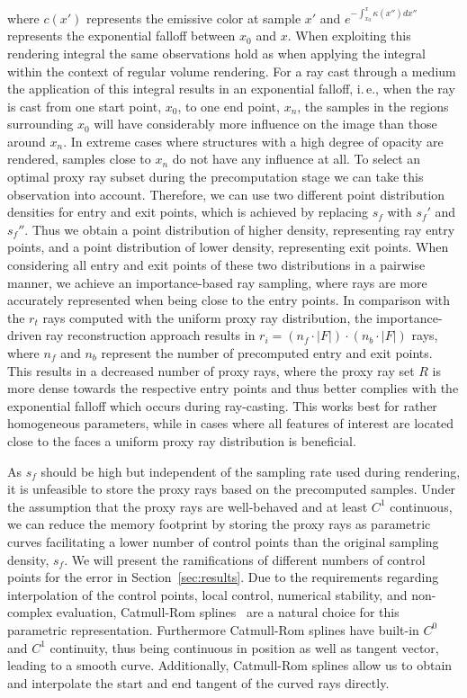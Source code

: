 \documentclass[journal]{vgtc}                %
\begin{document}
\noindent where $c(x')$ represents the emissive color at sample $x'$ and $e^{-\int_{x_0}^{x}\kappa(x'')dx''}$ represents the exponential falloff between $x_0$ and $x$. When exploiting this rendering integral the same observations hold as when applying the integral within the context of regular volume rendering. For a ray cast through a medium the application of this integral results in an exponential falloff, i.\,e., when the ray is cast from one start point, $x_0$, to one end point, $x_n$, the samples in the regions surrounding $x_0$ will have considerably more influence on the image than those around $x_n$. In extreme cases where structures with a high degree of opacity are rendered, samples close to $x_n$ do not have any influence at all. To select an optimal proxy ray subset during the precomputation stage we can take this observation into account. Therefore, we can use two different point distribution densities for entry and exit points, which is achieved by replacing $s_f$ with $s_f'$ and $s_f''$. Thus we obtain a point distribution of higher density, representing ray entry points, and a point distribution of lower density, representing exit points. When considering all entry and exit points of these two distributions in a pairwise manner, we achieve an importance-based ray sampling, where rays are more accurately represented when being close to the entry points. In comparison with the $r_t$ rays computed with the uniform proxy ray distribution, the importance-driven ray reconstruction approach results in $r_i = (n_f \cdot \left|F\right|) \cdot (n_b \cdot \left|F\right|)$ rays, where $n_f$ and $n_b$ represent the number of precomputed entry and exit points. This results in a decreased number of proxy rays, where the proxy ray set $R$ is more dense towards the respective entry points and thus better complies with the exponential falloff which occurs during ray-casting. This works best for rather homogeneous parameters, while in cases where all features of interest are located close to the faces a uniform proxy ray distribution is beneficial.

As $s_f$ should be high but independent of the sampling rate used during rendering, it is unfeasible to store the proxy rays based on the precomputed samples. Under the assumption that the proxy rays are well-behaved and at least $C^1$ continuous, we can reduce the memory footprint by storing the proxy rays as parametric curves facilitating a lower number of control points than the original sampling density, $s_f$. We will present the ramifications of different numbers of control points for the error in Section~\ref{sec:results}. Due to the requirements regarding interpolation of the control points, local control, numerical stability, and non-complex evaluation, Catmull-Rom splines~\cite{catmull74splines} are a natural choice for this parametric representation. Furthermore Catmull-Rom splines have built-in $C^{0}$ and $C^{1}$ continuity, thus being continuous in position as well as tangent vector, leading to a smooth curve. Additionally, Catmull-Rom splines allow us to obtain and interpolate the start and end tangent of the curved rays directly.
%
%
%
\end{document}
